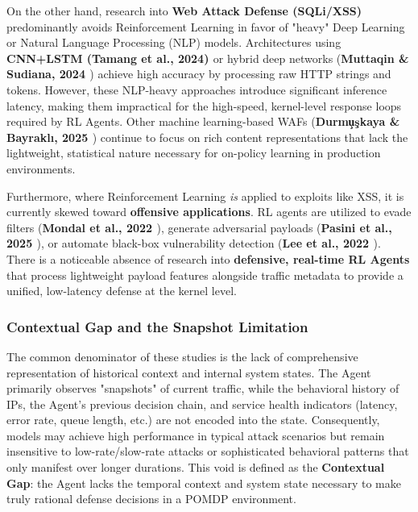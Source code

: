 \documentclass[12pt,a4paper]{report}
\begin{document}
On the other hand, research into \textbf{Web Attack Defense (SQLi/XSS)} predominantly avoids Reinforcement Learning in favor of "heavy" Deep Learning or Natural Language Processing (NLP) models. Architectures using \textbf{CNN+LSTM (Tamang et al., 2024) \cite{tamang2024securing}} or hybrid deep networks (\textbf{Muttaqin \& Sudiana, 2024 \cite{muttaqin2024design}}) achieve high accuracy by processing raw HTTP strings and tokens. However, these NLP-heavy approaches introduce significant inference latency, making them impractical for the high-speed, kernel-level response loops required by RL Agents. Other machine learning-based WAFs (\textbf{Durm\c{u}\c{s}kaya \& Bayrakl\i, 2025 \cite{durmuskaya2025web}}) continue to focus on rich content representations that lack the lightweight, statistical nature necessary for on-policy learning in production environments.

Furthermore, where Reinforcement Learning \textit{is} applied to exploits like XSS, it is currently skewed toward \textbf{offensive applications}. RL agents are utilized to evade filters (\textbf{Mondal et al., 2022 \cite{mondal2022xss}}), generate adversarial payloads (\textbf{Pasini et al., 2025 \cite{pasini2025xss}}), or automate black-box vulnerability detection (\textbf{Lee et al., 2022 \cite{lee2022link}}). There is a noticeable absence of research into \textbf{defensive, real-time RL Agents} that process lightweight payload features alongside traffic metadata to provide a unified, low-latency defense at the kernel level.

\subsubsection*{Contextual Gap and the Snapshot Limitation}

The common denominator of these studies is the lack of comprehensive representation of historical context and internal system states. The Agent primarily observes "snapshots" of current traffic, while the behavioral history of IPs, the Agent's previous decision chain, and service health indicators (latency, error rate, queue length, etc.) are not encoded into the state. Consequently, models may achieve high performance in typical attack scenarios but remain insensitive to low-rate/slow-rate attacks or sophisticated behavioral patterns that only manifest over longer durations. This void is defined as the \textbf{Contextual Gap}: the Agent lacks the temporal context and system state necessary to make truly rational defense decisions in a POMDP environment.
\end{document}
